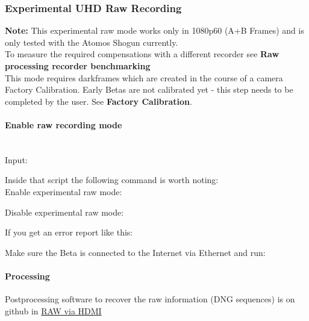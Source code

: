 \subsubsection{Experimental UHD Raw Recording}

\textbf{Note:} This experimental raw mode works only in 1080p60 (A+B Frames) and is only tested with the Atomos Shogun currently. \\

To measure the required compensations with a different recorder see \textbf{Raw processing recorder benchmarking}\\

This mode requires darkframes which are created in the course of a camera Factory Calibration. Early Betas are not calibrated yet - this step needs to be completed by the user. See \textbf{Factory Calibration}.\\

\paragraph{Enable raw recording mode}\\

Input:


Inside that script the following command is worth noting:\\

Enable experimental raw mode: 


Disable experimental raw mode: 


If you get an error report like this: 

    
Make sure the Beta is connected to the Internet via Ethernet and run:     




\paragraph{Processing}

Postprocessing software to recover the raw information (DNG sequences) is on github in \href{https://github.com/apertus-open-source-cinema/misc-tools-utilities/tree/master/raw-via-hdmi}{RAW via HDMI}\\

